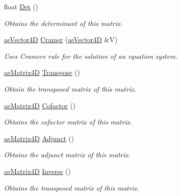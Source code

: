 \begin{DoxyCompactItemize}
\item 
float \hyperlink{structae_core_1_1ae_matrix4_d_a4914b29b61187eb42c07d12b281fa39f}{Det} ()
\begin{DoxyCompactList}\small\item\em Obtains the determinant of this matrix. \end{DoxyCompactList}\item 
\hyperlink{structae_core_1_1ae_vector4_d}{ae\+Vector4D} \hyperlink{structae_core_1_1ae_matrix4_d_a4803d4b1c2b49e08fadb744b19174a86}{Cramer} (\hyperlink{structae_core_1_1ae_vector4_d}{ae\+Vector4D} \&V)
\begin{DoxyCompactList}\small\item\em Uses Cramer\textquotesingle{}s rule for the solution of an equation system. \end{DoxyCompactList}\item 
\hyperlink{structae_core_1_1ae_matrix4_d}{ae\+Matrix4D} \hyperlink{structae_core_1_1ae_matrix4_d_ad5aa135a3fe6f520c17a7f713c2ccd62}{Transpose} ()
\begin{DoxyCompactList}\small\item\em Obtain the transposed matrix of this matrix. \end{DoxyCompactList}\item 
\hyperlink{structae_core_1_1ae_matrix4_d}{ae\+Matrix4D} \hyperlink{structae_core_1_1ae_matrix4_d_af34179df7019e2c63a1ee7194cec84b4}{Cofactor} ()
\begin{DoxyCompactList}\small\item\em Obtains the cofactor matrix of this matrix. \end{DoxyCompactList}\item 
\hyperlink{structae_core_1_1ae_matrix4_d}{ae\+Matrix4D} \hyperlink{structae_core_1_1ae_matrix4_d_a579cae792977f687abe6d390d7813e0a}{Adjunct} ()
\begin{DoxyCompactList}\small\item\em Obtains the adjunct matrix of this matrix. \end{DoxyCompactList}\item 
\hyperlink{structae_core_1_1ae_matrix4_d}{ae\+Matrix4D} \hyperlink{structae_core_1_1ae_matrix4_d_ad059c11181b1c2429716a4729d563ce0}{Inverse} ()
\begin{DoxyCompactList}\small\item\em Obtains the transposed matrix of this matrix. \end{DoxyCompactList}\end{DoxyCompactItemize}
